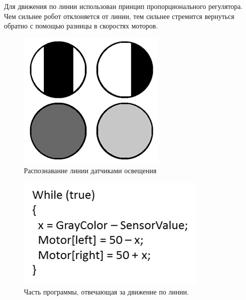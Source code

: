 Для движения по линии использован принцип пропорционального регулятора. Чем сильнее робот отклоняется от линии, тем сильнее стремится вернуться обратно с помощью разницы в скоростях моторов.
\clearpage
\begin{figure}[h!]
	\begin{center}
		\includegraphics[width=0.84\linewidth]{chapters/chapter28/images/2}
		\caption{Распознавание линии датчиками освещения}
		\label{ris:image28x2}
	\end{center}
\end{figure}

\begin{figure}[h!]
	\begin{center}
		\includegraphics[width=0.84\linewidth]{chapters/chapter28/images/3}
		\caption{Часть программы, отвечающая за движение по линии.}
		\label{ris:image28x3}
	\end{center}
\end{figure}

